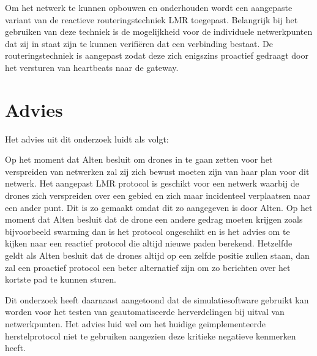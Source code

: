 \documentclass[a4paper, 11pt, oneside]{report}
\begin{document}
Om het netwerk te kunnen opbouwen en onderhouden wordt een aangepaste variant van de reactieve routeringstechniek LMR toegepast. Belangrijk bij het gebruiken van deze techniek is de mogelijkheid voor de individuele netwerkpunten dat zij in staat zijn te kunnen verifiëren dat een verbinding bestaat. De routeringstechniek is aangepast zodat deze zich enigszins proactief gedraagt door het versturen van heartbeats naar de gateway. 

\section{Advies}
Het advies uit dit onderzoek luidt als volgt:

Op het moment dat Alten besluit om drones in te gaan zetten voor het verspreiden van netwerken zal zij zich bewust moeten zijn van haar plan voor dit netwerk.
Het aangepast LMR protocol is geschikt voor een netwerk waarbij de drones zich verspreiden over een gebied en zich maar incidenteel verplaatsen naar een ander punt.
Dit is zo gemaakt omdat dit zo aangegeven is door Alten.
Op het moment dat Alten besluit dat de drone een andere gedrag moeten krijgen zoals bijvoorbeeld swarming dan is het protocol ongeschikt en is het advies om te kijken naar een reactief protocol die altijd nieuwe paden berekend.
Hetzelfde geldt als Alten besluit dat de drones altijd op een zelfde positie zullen staan, dan zal een proactief protocol een beter alternatief zijn om zo berichten over het kortste pad te kunnen sturen.    

Dit onderzoek heeft daarnaast aangetoond dat de simulatiesoftware gebruikt kan worden voor het testen van geautomatiseerde herverdelingen bij uitval van netwerkpunten. Het advies luid wel om het huidige geïmplementeerde herstelprotocol niet te gebruiken aangezien deze kritieke negatieve kenmerken heeft. 




\clearpage
\appendix
\end{document}
